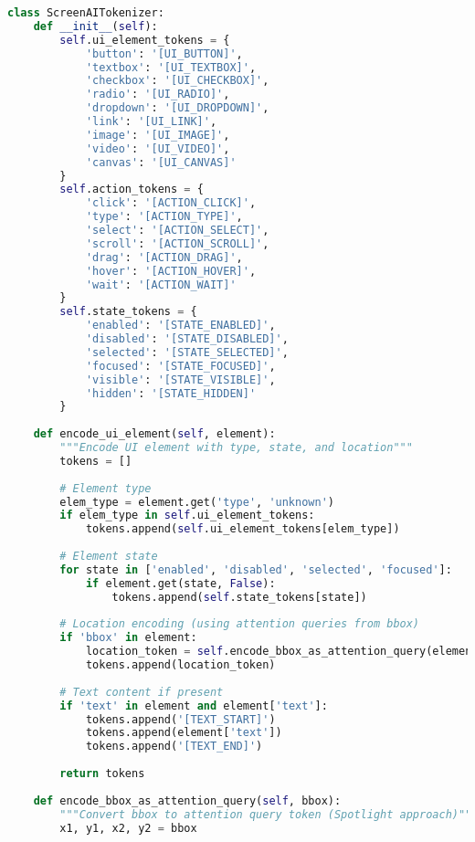 \begin{lstlisting}[language=Python, caption=ScreenAI-style interface understanding]
class ScreenAITokenizer:
    def __init__(self):
        self.ui_element_tokens = {
            'button': '[UI_BUTTON]',
            'textbox': '[UI_TEXTBOX]',
            'checkbox': '[UI_CHECKBOX]',
            'radio': '[UI_RADIO]',
            'dropdown': '[UI_DROPDOWN]',
            'link': '[UI_LINK]',
            'image': '[UI_IMAGE]',
            'video': '[UI_VIDEO]',
            'canvas': '[UI_CANVAS]'
        }
        self.action_tokens = {
            'click': '[ACTION_CLICK]',
            'type': '[ACTION_TYPE]',
            'select': '[ACTION_SELECT]',
            'scroll': '[ACTION_SCROLL]',
            'drag': '[ACTION_DRAG]',
            'hover': '[ACTION_HOVER]',
            'wait': '[ACTION_WAIT]'
        }
        self.state_tokens = {
            'enabled': '[STATE_ENABLED]',
            'disabled': '[STATE_DISABLED]',
            'selected': '[STATE_SELECTED]',
            'focused': '[STATE_FOCUSED]',
            'visible': '[STATE_VISIBLE]',
            'hidden': '[STATE_HIDDEN]'
        }
    
    def encode_ui_element(self, element):
        """Encode UI element with type, state, and location"""
        tokens = []
        
        # Element type
        elem_type = element.get('type', 'unknown')
        if elem_type in self.ui_element_tokens:
            tokens.append(self.ui_element_tokens[elem_type])
        
        # Element state
        for state in ['enabled', 'disabled', 'selected', 'focused']:
            if element.get(state, False):
                tokens.append(self.state_tokens[state])
        
        # Location encoding (using attention queries from bbox)
        if 'bbox' in element:
            location_token = self.encode_bbox_as_attention_query(element['bbox'])
            tokens.append(location_token)
        
        # Text content if present
        if 'text' in element and element['text']:
            tokens.append('[TEXT_START]')
            tokens.append(element['text'])
            tokens.append('[TEXT_END]')
        
        return tokens
    
    def encode_bbox_as_attention_query(self, bbox):
        """Convert bbox to attention query token (Spotlight approach)"""
        x1, y1, x2, y2 = bbox
        

\end{lstlisting}
